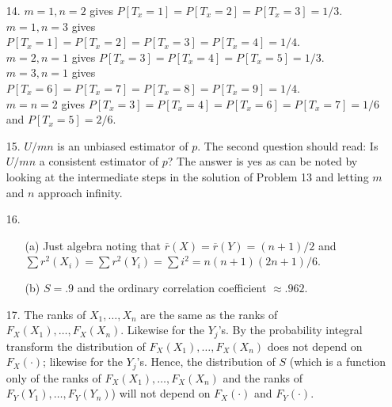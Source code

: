 \begin{enumerate}
	\newpage
	
	\item[14.] $m=1, n=2$ gives $P[T_x=1]=P[T_x=2]=P[T_x=3]=1/3$. \\
			$m=1, n=3$ gives $P[T_x=1]=P[T_x=2]=P[T_x=3]=P[T_x=4]=1/4$. \\
			$m=2, n=1$ gives $P[T_x=3]=P[T_x=4]=P[T_x=5]=1/3$. \\
			$m=3, n=1$ gives $P[T_x=6]=P[T_x=7]=P[T_x=8]=P[T_x=9]=1/4$. \\
			$m=n=2$ gives $P[T_x=3]=P[T_x=4]=P[T_x=6]=P[T_x=7]=1/6$ and $P[T_x=5]=2/6$. 
			
	\item[15.] $U/mn$ is an unbiased estimator of $p$. The second question should read: Is $U/mn$ a consistent estimator of $p$? The answer is yes as can be noted by looking at the intermediate steps in the solution of Problem 13 and letting $m$ and $n$ approach infinity.
	
	\item[16.] \begin{enumerate}
		\item[(a)] Just algebra noting that $\overline{r}(X)=\overline{r}(Y) = (n+1)/2$ and $\sum r^2(X_i)=\sum r^2(Y_i) = \sum i^2 = n(n+1)(2n+1)/6$.
		\item[(b)] $S=.9$ and the ordinary correlation coefficient $\approx .962$.
	\end{enumerate}
	
	\item[17.] The ranks of $X_1, \ldots, X_n$ are the same as the ranks of $F_X(X_1), \ldots, F_X(X_n)$. Likewise for the $Y_j$'s. By the probability integral transform the distribution of $F_X(X_1), \ldots, F_X(X_n)$ does not depend on $F_X(\cdot)$; likewise for the $Y_j$'s. Hence, the distribution of $S$ (which is a function only of the ranks of $F_X(X_1), \ldots, F_X(X_n)$ and the ranks of $F_Y(Y_1), \ldots, F_Y(Y_n)$) will not depend on $F_X(\cdot)$ and $F_Y(\cdot)$.
	

\end{enumerate}
